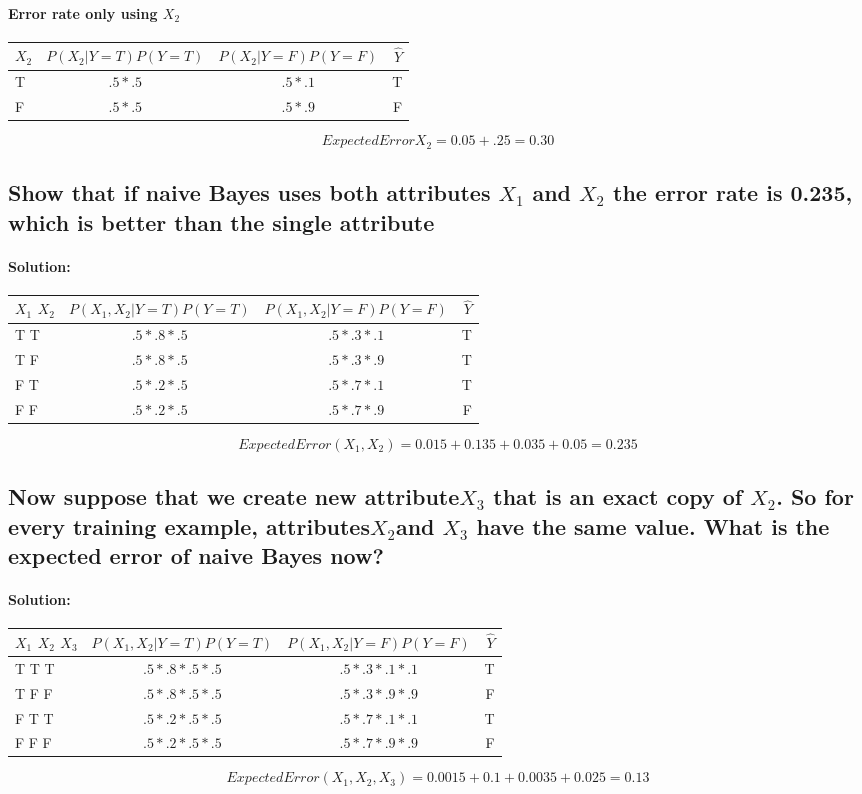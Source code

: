 \documentclass{article}
\begin{document}
\paragraph{Error rate only using $X_2$}
\begin{tabular}{l*{2}{c}||r}
$X_2$              & $P(X_2|Y =T)P( Y =T)$&$P(X_2|Y =F)P( Y =F) $ & $\hat{Y}$ \\
\hline
T & $.5 *.5 $& $.5*.1$  & T   \\
F & $.5* .5$ & $.5 *.9$  &  F  \\
\end{tabular}
\linebreak
$$Expected Error X_2 = 0.05 +.25 =0.30 $$ 


\subsection{Show that if naive Bayes uses both attributes $X_1$ and $X_2$ the error rate is 0.235, which is better than the single attribute}
\paragraph{Solution:}
\begin{tabular}{l*{2}{c}||r}
$X_1$ $X_2$             & $P(X_1, X_2|Y =T)P( Y =T)$&$P(X_1, X_2|Y =F)P( Y =F) $ & $\hat{Y}$ \\
\hline
T T & $.5 *.8* .5$ & $.5*.3*.1 $  &  T \\
T F & $.5* .8* .5$ & $.5 *.3*.9$  &  T  \\
F T & $.5* .2* .5$ & $.5 *.7*.1$  &  T  \\
F F & $.5* .2* .5$ & $.5 *.7*.9$  &  F   \\
\end{tabular}
\linebreak
$$Expected Error( X_1, X_2)  = 0.015 +0.135 +0.035+ 0.05 =0.235 $$ 

\subsection{Now suppose that we create new attribute$ X_3$ that is an exact copy of $X_2$. So for every training example, attributes$ X_2 $and $X_3$ have the same value. What is the expected error of naive Bayes now?}
\paragraph{Solution:}
\begin{tabular}{l*{2}{c}||r}
$X_1$ $X_2$ $X_3$   & $P(X_1, X_2|Y =T)P( Y =T)$&$P(X_1, X_2|Y =F)P( Y =F) $ & $\hat{Y}$ \\
\hline
T T T & $.5 *.8*.5 *.5$ & $.5*.3*.1*.1 $   &  T \\
T F F & $.5* .8* .5 *.5$ & $.5 *.3*.9*.9$  &  F  \\
F T T & $.5* .2* .5 *.5$ & $.5 *.7*.1*.1$  &  T  \\
F F F & $.5* .2* .5 *.5$ & $.5 *.7*.9*.9$  &  F   \\
\end{tabular}
\linebreak
$$Expected Error( X_1, X_2,X_3)  = 0.0015 +0.1 +0.0035+ 0.025 =0.13 $$
\end{document}
